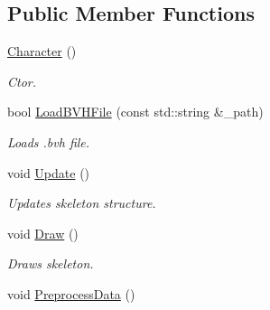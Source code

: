 \subsection*{Public Member Functions}
\begin{DoxyCompactItemize}
\item 
\hyperlink{class_character_adc27bdd255876169bad2ed0bae0cffb5}{Character} ()\hypertarget{class_character_adc27bdd255876169bad2ed0bae0cffb5}{}\label{class_character_adc27bdd255876169bad2ed0bae0cffb5}

\begin{DoxyCompactList}\small\item\em Ctor. \end{DoxyCompactList}\item 
bool \hyperlink{class_character_a421006ac40b2fa45f0ff7f4ed4cef814}{Load\+B\+V\+H\+File} (const std\+::string \&\+\_\+path)
\begin{DoxyCompactList}\small\item\em Loads .bvh file. \end{DoxyCompactList}\item 
void \hyperlink{class_character_a0f024c74060ed6fdf234380fc9f4c098}{Update} ()\hypertarget{class_character_a0f024c74060ed6fdf234380fc9f4c098}{}\label{class_character_a0f024c74060ed6fdf234380fc9f4c098}

\begin{DoxyCompactList}\small\item\em Updates skeleton structure. \end{DoxyCompactList}\item 
void \hyperlink{class_character_a681d67b227b0f7abb8508958841c6976}{Draw} ()\hypertarget{class_character_a681d67b227b0f7abb8508958841c6976}{}\label{class_character_a681d67b227b0f7abb8508958841c6976}

\begin{DoxyCompactList}\small\item\em Draws skeleton. \end{DoxyCompactList}\item 
void \hyperlink{class_character_a9dd3b1390a8842b49bab69d9a30c398e}{Preprocess\+Data} ()\hypertarget{class_character_a9dd3b1390a8842b49bab69d9a30c398e}{}\label{class_character_a9dd3b1390a8842b49bab69d9a30c398e}


\end{DoxyCompactItemize}
